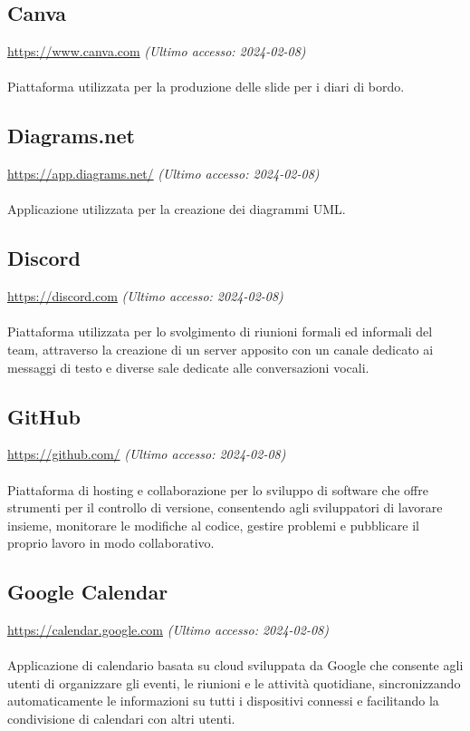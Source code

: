 \documentclass[10pt, a4paper]{article}
\begin{document}
\subsection{Canva}
\href{https://www.canva.com}{https://www.canva.com} \textit{(Ultimo accesso: 2024-02-08)}\\\\
Piattaforma utilizzata per la produzione delle slide per i diari di bordo. 

\subsection{Diagrams.net}
\href{https://app.diagrams.net/}{https://app.diagrams.net/} \textit{(Ultimo accesso: 2024-02-08)}\\\\
Applicazione utilizzata per la creazione dei diagrammi UML.

\subsection{Discord}
\href{https://discord.com}{https://discord.com} \textit{(Ultimo accesso: 2024-02-08)}\\\\
Piattaforma utilizzata per lo svolgimento di riunioni formali ed informali del team, attraverso la creazione di un server apposito con un canale dedicato ai messaggi di testo e diverse sale dedicate alle conversazioni vocali.

\subsection{GitHub}
\href{https://github.com/}{https://github.com/} \textit{(Ultimo accesso: 2024-02-08)}\\\\
Piattaforma di hosting e collaborazione per lo sviluppo di software che offre strumenti per il controllo di versione, consentendo agli sviluppatori di lavorare insieme, monitorare le modifiche al codice, gestire problemi e pubblicare il proprio lavoro in modo collaborativo.

\subsection{Google Calendar}
\href{https://calendar.google.com}{https://calendar.google.com} \textit{(Ultimo accesso: 2024-02-08)}\\\\
Applicazione di calendario basata su cloud sviluppata da Google che consente agli utenti di organizzare gli eventi, le riunioni e le attività quotidiane, sincronizzando automaticamente
le informazioni su tutti i dispositivi connessi e facilitando la condivisione di calendari con altri utenti.
\end{document}
